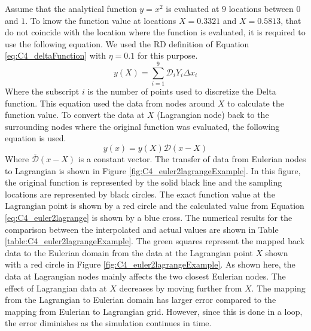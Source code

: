 Assume that the analytical function $y=x^2$ is evaluated at $9$ locations between $0$ and $1$. To know the function value at locations $X = 0.3321$ and $X = 0.5813$, that do not coincide with the location where the function is evaluated, it is required to use the following equation. We used the RD definition of Equation \eqref{eq:C4_deltaFunction} with $\eta = 0.1$ for this purpose.
%
\begin{equation}\label{eq:C4_euler2lagrange}
    y(X) = \sum_{i=1}^9 \mathcal{D}_i Y_i \Delta x_i
\end{equation}
%
Where the subscript $i$ is the number of points used to discretize the Delta function. This equation used the data from nodes around $X$ to calculate the function value. To convert the data at $X$ (Lagrangian node) back to the surrounding nodes where the original function was evaluated, the following equation is used.
%
\begin{equation}
    y(x) = y(X) \mathcal{D}(x - X)
\end{equation}
%
Where $\bar{\mathcal{D}}(x - X)$ is a constant vector. The transfer of data from Eulerian nodes to Lagrangian is shown in Figure \ref{fig:C4_euler2lagrangeExample}. In this figure, the original function is represented by the solid black line and the sampling locations are represented by black circles. The exact function value at the Lagrangian point is shown by a red circle and the calculated value from Equation \eqref{eq:C4_euler2lagrange} is shown by a blue cross. The numerical results for the comparison between the interpolated and actual values are shown in Table \ref{table:C4_euler2lagrangeExample}. The green squares represent the mapped back data to the Eulerian domain from the data at the Lagrangian point $X$ shown with a red circle in Figure \ref{fig:C4_euler2lagrangeExample}. As shown here, the data at Lagrangian nodes mainly affects the two closest Eulerian nodes. The effect of Lagrangian data at $X$ decreases by moving further from $X$. The mapping from the Lagrangian to Eulerian domain has larger error compared to the mapping from Eulerian to Lagrangian grid. However, since this is done in a loop, the error diminishes as the simulation continues in time.
%
